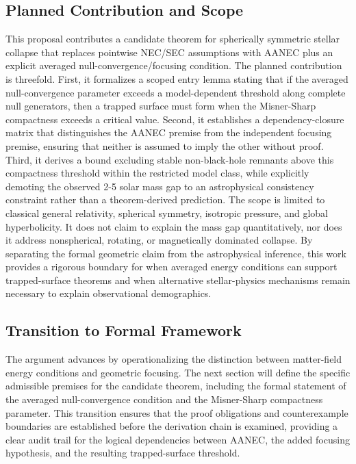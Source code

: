 \documentclass[conference]{IEEEtran}
\begin{document}
\subsection{Planned Contribution and Scope}
This proposal contributes a candidate theorem for spherically symmetric stellar collapse that replaces pointwise NEC/SEC assumptions with AANEC plus an explicit averaged null-convergence/focusing condition. The planned contribution is threefold. First, it formalizes a scoped entry lemma stating that if the averaged null-convergence parameter exceeds a model-dependent threshold along complete null generators, then a trapped surface must form when the Misner-Sharp compactness exceeds a critical value. Second, it establishes a dependency-closure matrix that distinguishes the AANEC premise from the independent focusing premise, ensuring that neither is assumed to imply the other without proof. Third, it derives a bound excluding stable non-black-hole remnants above this compactness threshold within the restricted model class, while explicitly demoting the observed 2-5 solar mass gap to an astrophysical consistency constraint rather than a theorem-derived prediction. The scope is limited to classical general relativity, spherical symmetry, isotropic pressure, and global hyperbolicity. It does not claim to explain the mass gap quantitatively, nor does it address nonspherical, rotating, or magnetically dominated collapse. By separating the formal geometric claim from the astrophysical inference, this work provides a rigorous boundary for when averaged energy conditions can support trapped-surface theorems and when alternative stellar-physics mechanisms remain necessary to explain observational demographics.

\subsection{Transition to Formal Framework}
The argument advances by operationalizing the distinction between matter-field energy conditions and geometric focusing. The next section will define the specific admissible premises for the candidate theorem, including the formal statement of the averaged null-convergence condition and the Misner-Sharp compactness parameter. This transition ensures that the proof obligations and counterexample boundaries are established before the derivation chain is examined, providing a clear audit trail for the logical dependencies between AANEC, the added focusing hypothesis, and the resulting trapped-surface threshold.~\cite{cite_7a407c865faafd11}
\end{document}
